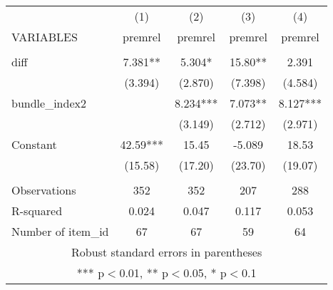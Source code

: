 \documentclass[]{article}
\begin{document}
\begin{tabular}{lcccc} \hline
 & (1) & (2) & (3) & (4) \\
VARIABLES & premrel & premrel & premrel & premrel \\ \hline
 &  &  &  &  \\
diff & 7.381** & 5.304* & 15.80** & 2.391 \\
 & (3.394) & (2.870) & (7.398) & (4.584) \\
bundle\_index2 &  & 8.234*** & 7.073** & 8.127*** \\
 &  & (3.149) & (2.712) & (2.971) \\
Constant & 42.59*** & 15.45 & -5.089 & 18.53 \\
 & (15.58) & (17.20) & (23.70) & (19.07) \\
 &  &  &  &  \\
Observations & 352 & 352 & 207 & 288 \\
R-squared & 0.024 & 0.047 & 0.117 & 0.053 \\
 Number of item\_id & 67 & 67 & 59 & 64 \\ \hline
\multicolumn{5}{c}{ Robust standard errors in parentheses} \\
\multicolumn{5}{c}{ *** p$<$0.01, ** p$<$0.05, * p$<$0.1} \\
\end{tabular}
\end{document}
